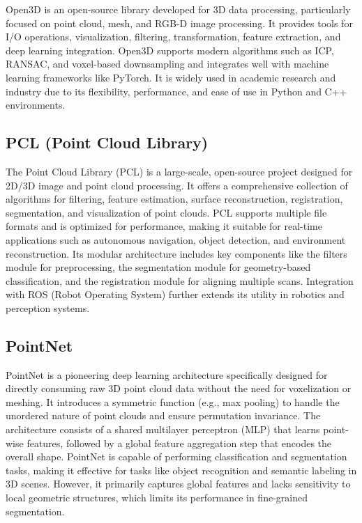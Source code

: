 \documentclass[../report.tex]{subfiles}
\begin{document}
    Open3D is an open-source library developed for 3D data processing, particularly focused on point cloud, mesh, and RGB-D image processing. It provides tools for I/O operations, visualization, filtering, transformation, feature extraction, and deep learning integration. Open3D supports modern algorithms such as ICP, RANSAC, and voxel-based downsampling and integrates well with machine learning frameworks like PyTorch. It is widely used in academic research and industry due to its flexibility, performance, and ease of use in Python and C++ environments.
    
    \subsection{PCL (Point Cloud Library)}
    
    The Point Cloud Library (PCL) is a large-scale, open-source project designed for 2D/3D image and point cloud processing\cite{PCL}. It offers a comprehensive collection of algorithms for filtering, feature estimation, surface reconstruction, registration, segmentation, and visualization of point clouds. PCL supports multiple file formats and is optimized for performance, making it suitable for real-time applications such as autonomous navigation, object detection, and environment reconstruction. Its modular architecture includes key components like the filters module for preprocessing, the segmentation module for geometry-based classification, and the registration module for aligning multiple scans. Integration with ROS (Robot Operating System) further extends its utility in robotics and perception systems.
    
    \subsection{PointNet}
    
    PointNet\cite{PointNet} is a pioneering deep learning architecture specifically designed for directly consuming raw 3D point cloud data without the need for voxelization or meshing. It introduces a symmetric function (e.g., max pooling) to handle the unordered nature of point clouds and ensure permutation invariance. The architecture consists of a shared multilayer perceptron (MLP) that learns point-wise features, followed by a global feature aggregation step that encodes the overall shape. PointNet is capable of performing classification and segmentation tasks, making it effective for tasks like object recognition and semantic labeling in 3D scenes. However, it primarily captures global features and lacks sensitivity to local geometric structures, which limits its performance in fine-grained segmentation.
    
\end{document}
